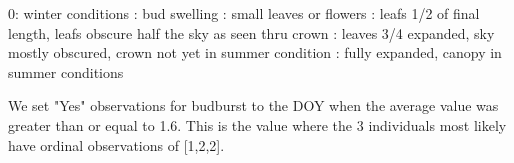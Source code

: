 \documentclass[a4paper,12pt]{article}
\begin{document}
0: winter conditions : bud swelling : small leaves or flowers : leafs 1/2 of final length, leafs obscure half the sky as seen thru crown : leaves 3/4 expanded, sky mostly obscured, crown not yet in summer condition : fully expanded, canopy in summer conditions \newline

We set "Yes" observations for budburst to the DOY when the average value was greater than or equal to 1.6. This is the value where the 3 individuals most likely have ordinal observations of [1,2,2].
\end{document}
